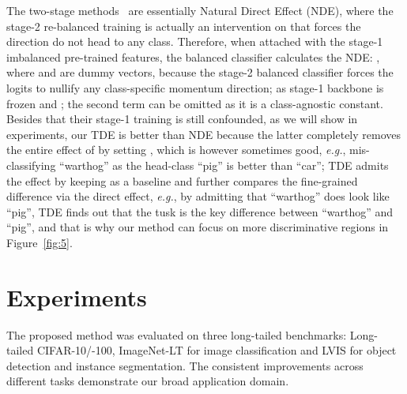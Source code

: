 \documentclass{article}
\newcommand{\eg}{\textit{e.g.}}
\begin{document}
The two-stage methods~\cite{zhou2019bbn, kang2019decoupling} are essentially Natural Direct Effect (NDE), where the stage-2 re-balanced training is actually an intervention on  that forces the direction  do not head to any class. Therefore, when attached with the stage-1 imbalanced pre-trained features, the balanced classifier calculates the NDE:  , where  and  are dummy vectors, because the stage-2 balanced classifier forces the logits to nullify any class-specific momentum direction;  as stage-1 backbone is frozen and ; the second term can be omitted as it is a class-agnostic constant. Besides that their stage-1 training is still confounded, as we will show in experiments, our TDE is better than NDE because the latter completely removes the entire effect of  by setting , which is however sometimes good, \eg, mis-classifying ``warthog'' as the head-class ``pig'' is better than ``car''; TDE admits the effect by keeping  as a baseline and further compares the fine-grained difference via the direct effect, \eg, by admitting that ``warthog'' does look like ``pig'', TDE finds out that the tusk is the key difference between ``warthog'' and ``pig'', and that is why our method can focus on more discriminative regions in Figure~\ref{fig:5}.























\section{Experiments}
\label{sec:experiments}
The proposed method was evaluated on three long-tailed benchmarks: Long-tailed CIFAR-10/-100, ImageNet-LT for image classification and LVIS for object detection and instance segmentation. The consistent improvements across different tasks demonstrate our broad application domain.
\end{document}
